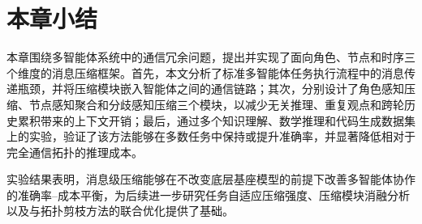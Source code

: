 \section{本章小结}

本章围绕多智能体系统中的通信冗余问题，提出并实现了面向角色、节点和时序三个维度的消息压缩框架。首先，本文分析了标准多智能体任务执行流程中的消息传递瓶颈，并将压缩模块嵌入智能体之间的通信链路；其次，分别设计了角色感知压缩、节点感知聚合和分歧感知压缩三个模块，以减少无关推理、重复观点和跨轮历史累积带来的上下文开销；最后，通过多个知识理解、数学推理和代码生成数据集上的实验，验证了该方法能够在多数任务中保持或提升准确率，并显著降低相对于完全通信拓扑的推理成本。

实验结果表明，消息级压缩能够在不改变底层基座模型的前提下改善多智能体协作的准确率--成本平衡，为后续进一步研究任务自适应压缩强度、压缩模块消融分析以及与拓扑剪枝方法的联合优化提供了基础。
